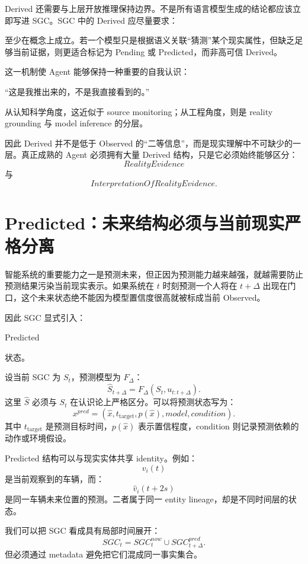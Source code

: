 Derived 还需要与上层开放推理保持边界。不是所有语言模型生成的结论都应该立即写进 SGC。SGC 中的 Derived 应尽量要求：
\begin{statementbox}
\centering
{}
\end{statementbox}
至少在概念上成立。若一个模型只是根据语义关联“猜测”某个现实属性，但缺乏足够当前证据，则更适合标记为 Pending 或 Predicted，而非高可信 Derived。

这一机制使 Agent 能够保持一种重要的自我认识：
\begin{statementbox}
“这是我推出来的，不是我直接看到的。”
\end{statementbox}
从认知科学角度，这近似于 source monitoring；从工程角度，则是 reality grounding 与 model inference 的分层。

因此 Derived 并不是低于 Observed 的“二等信息”，而是现实理解中不可缺少的一层。真正成熟的 Agent 必须拥有大量 Derived 结构，只是它必须始终能够区分：
\[
RealityEvidence
\]
与
\[
InterpretationOfRealityEvidence .
\]

\section{Predicted：未来结构必须与当前现实严格分离}

智能系统的重要能力之一是预测未来，但正因为预测能力越来越强，就越需要防止预测结果污染当前现实表示。如果系统在 $t$ 时刻预测一个人将在 $t+\Delta$ 出现在门口，这个未来状态绝不能因为模型置信度很高就被标成当前 Observed。

因此 SGC 显式引入：
\begin{statementbox}
Predicted
\end{statementbox}
状态。

设当前 SGC 为 $S_t$，预测模型为 $F_\Delta$：
\[
\hat S_{t+\Delta}
=
F_\Delta(S_t,u_{t:t+\Delta}).
\]
这里 $\hat S$ 必须与 $S_t$ 在认识论上严格区分。可以将预测状态写为：
\[
x^{pred}
=
(
\hat x,
t_{\mathrm{target}},
p(\hat x),
model,
condition
).
\]
其中 $t_{\mathrm{target}}$ 是预测目标时间，$p(\hat x)$ 表示置信程度，condition 则记录预测依赖的动作或环境假设。

Predicted 结构可以与现实实体共享 identity。例如：
\[
v_i(t)
\]
是当前观察到的车辆，而：
\[
\hat v_i(t+2s)
\]
是同一车辆未来位置的预测。二者属于同一 entity lineage，却是不同时间层的状态。

我们可以把 SGC 看成具有局部时间展开：
\[
SGC_t
=
SGC_t^{now}
\cup
SGC_{t+\Delta}^{pred}.
\]
但必须通过 metadata 避免把它们混成同一事实集合。

